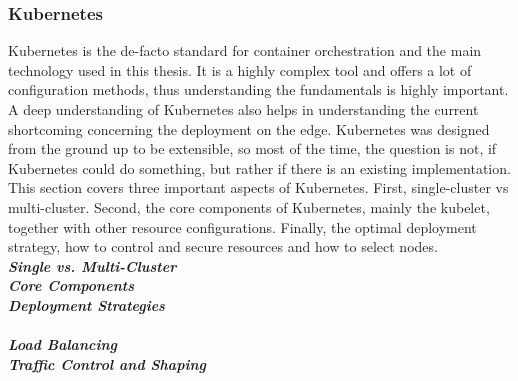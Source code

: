 \subsubsection{Kubernetes} \label{kubernetesStandardization efforts}
Kubernetes is the de-facto standard for container orchestration and the main technology used in this thesis. It is a highly complex tool and offers a lot of configuration methods, thus understanding the fundamentals is highly important. A deep understanding of Kubernetes also helps in understanding the current shortcoming concerning the deployment on the edge. Kubernetes was designed from the ground up to be extensible, so most of the time, the question is not, if Kubernetes could do something, but rather if there is an existing implementation.\\
This section covers three important aspects of Kubernetes. First, single-cluster vs multi-cluster. Second, the core components of Kubernetes, mainly the kubelet, together with other resource configurations. Finally, the optimal deployment strategy, how to control and secure resources and how to select nodes.\\[5mm]
\textbf{\textit{Single vs. Multi-Cluster}}\\

\textbf{\textit{Core Components}}\\

\textbf{\textit{Deployment Strategies}}\\

\\[5mm]
\textbf{\textit{Load Balancing}}\\

\textbf{\textit{Traffic Control and Shaping}}\\


